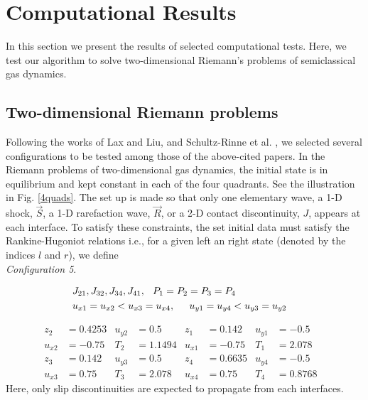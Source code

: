 \documentclass{rsproca}%
\begin{document}
\section{Computational Results}
\label{results}

In this section we present the results of selected computational tests.  Here, we test our algorithm to solve two-dimensional Riemann's problems of semiclassical gas dynamics.

\subsection{Two-dimensional Riemann problems}
\label{Riemannp}
Following the works of Lax and Liu, \cite{Laxliu95} and Schultz-Rinne et al. \cite{schultzrinne}, we selected several configurations to be tested among those of the above-cited papers. In the Riemann problems of two-dimensional gas dynamics, the initial state is in equilibrium and kept constant in each of the four quadrants. See the illustration in Fig. \ref{4quads}. The set up is made so that only one elementary wave, a 1-D  shock, $\vec{S}$, a 1-D rarefaction wave, $\vec{R}$, or a 2-D contact discontinuity, $J$, appears at each interface.
To satisfy these constraints, the set initial data must satisfy the Rankine-Hugoniot relations i.e., for a given left an right state (denoted by the indices $l$ and $r$), we define \\

{\em Configuration 5}.

\begin{eqnarray*}
&{J_{21}},J_{32},J_{34},{J_{41}},\hspace{0.1in}P_1=P_2=P_3=P_4&\\
&u_{x1}=u_{x2}<u_{x3}=u_{x4},\hspace{0.2in}u_{y1}=u_{y4}<u_{y3}=u_{y2}&
\label{con5setup}
\end{eqnarray*}

\begin{align*} 
z_2	&=0.4253& 	u_{y2}&=0.5& 	z_1&=0.142& 		u_{y1}&=-0.5& \\
u_{x2}&=-0.75&	T_2&=1.1494& 	u_{x1}&=-0.75& 	T_1&=2.078&		\\
z_3&=0.142&			u_{y3}&=0.5& 	z_4&=0.6635& 		u_{y4}&=-0.5&	\\
u_{x3}&=0.75&		T_3&=2.078& 	u_{x4}&=0.75& 	T_4&=0.8768&
\end{align*}
Here, only slip discontinuities are expected to propagate from each interfaces. \\
\end{document}
